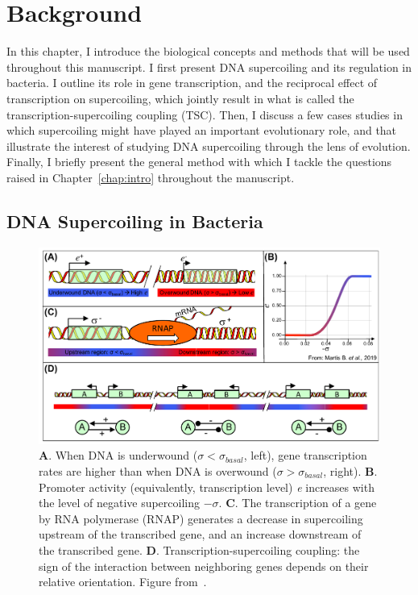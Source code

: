\chapter{Background}
\label{chap:background}

In this chapter, I introduce the biological concepts and methods that will be used throughout this manuscript.
I first present DNA supercoiling and its regulation in bacteria.
I outline its role in gene transcription, and the reciprocal effect of transcription on supercoiling, which jointly result in what is called the transcription-supercoiling coupling (TSC).
Then, I discuss a few cases studies in which supercoiling might have played an important evolutionary role, and that illustrate the interest of studying DNA supercoiling through the lens of evolution.
Finally, I briefly present the general method with which I tackle the questions raised in Chapter~\ref{chap:intro} throughout the manuscript.

\section{DNA Supercoiling in Bacteria}
\label{sec:background:sc}

\begin{figure}
  \centering
  \includegraphics[width=\textwidth]{alife/img/fig-theorique.pdf}
  \caption[Role of supercoiling in transcription, and description of the TSC]{\textbf{A}. When DNA is underwound ($\sigma < \sigma_{basal}$, left), gene transcription rates are higher than when DNA is overwound ($\sigma > \sigma_{basal}$, right).
  \textbf{B}. Promoter activity (equivalently, transcription level) \emph{e} increases with the level of negative supercoiling $-\sigma$.
  \textbf{C}. The transcription of a gene by RNA polymerase (RNAP) generates a decrease in supercoiling upstream of the transcribed gene, and an increase downstream of the transcribed gene.
  \textbf{D}. Transcription-supercoiling coupling: the sign of the interaction between neighboring genes depends on their relative orientation.
  Figure from~\citep{grohens2021}.}
  \label{fig:background:theory}
\end{figure}

